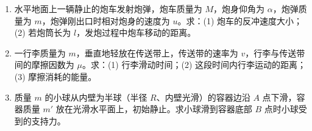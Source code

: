 \documentclass[12pt]{article}
\begin{document}
\begin{enumerate}[label=\textbf{例\arabic*.}, leftmargin=*]
\item 水平地面上一辆静止的炮车发射炮弹，炮车质量为 $M$，炮身仰角为 $\alpha$，炮弹质量为 $m$，炮弹刚出口时相对炮身的速度为 $u$。求：(1) 炮车的反冲速度大小；(2) 若炮筒长为 $l$，发炮过程中炮车移动的距离。

\item 一行李质量为 $m$，垂直地轻放在传送带上，传送带的速率为 $v$，行李与传送带间的摩擦因数为 $\mu$。求：(1) 行李滑动时间；(2) 这段时间内行李运动的距离；(3) 摩擦消耗的能量。

\item 质量 $m$ 的小球从内壁为半球（半径 $R$、内壁光滑）的容器边沿 $A$ 点下滑，容器质量 $m'$ 放在光滑水平面上，初始静止。求小球滑到容器底部 $B$ 点时小球受到的支持力。

\end{enumerate}
\end{document}
